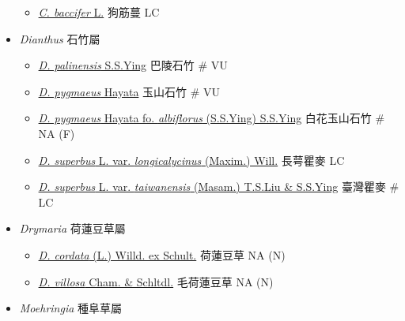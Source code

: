 \begin{itemize}
  \begin{itemize}
        \item[] \href{http://www.theplantlist.org/tpl1.1/search?q=Cucubalus+baccifer}{\textit{C. baccifer} L.}   狗筋蔓   LC
  \end{itemize}
 \item[] \textit{Dianthus} 石竹屬
                                
  \begin{itemize}
        \item[] \href{http://www.theplantlist.org/tpl1.1/search?q=Dianthus+palinensis}{\textit{D. palinensis} S.S.Ying}   巴陵石竹  \# VU
        \item[] \href{http://www.theplantlist.org/tpl1.1/search?q=Dianthus+pygmaeus}{\textit{D. pygmaeus} Hayata}   玉山石竹  \# VU
        \item[] \href{http://www.theplantlist.org/tpl1.1/search?q=Dianthus+pygmaeus+fo.+albiflorus}{\textit{D. pygmaeus} Hayata fo. \textit{albiflorus} (S.S.Ying) S.S.Ying}   白花玉山石竹  \# NA (F)
        \item[] \href{http://www.theplantlist.org/tpl1.1/search?q=Dianthus+superbus+var.+longicalycinus}{\textit{D. superbus} L. var. \textit{longicalycinus} (Maxim.) Will.}   長萼瞿麥   LC
        \item[] \href{http://www.theplantlist.org/tpl1.1/search?q=Dianthus+superbus+var.+taiwanensis}{\textit{D. superbus} L. var. \textit{taiwanensis} (Masam.) T.S.Liu \& S.S.Ying}   臺灣瞿麥  \# LC
  \end{itemize}
 \item[] \textit{Drymaria} 荷蓮豆草屬
                                
  \begin{itemize}
        \item[] \href{http://www.theplantlist.org/tpl1.1/search?q=Drymaria+cordata}{\textit{D. cordata} (L.) Willd. ex Schult.}   荷蓮豆草   NA (N)
        \item[] \href{http://www.theplantlist.org/tpl1.1/search?q=Drymaria+villosa}{\textit{D. villosa} Cham. \& Schltdl.}   毛荷蓮豆草   NA (N)
  \end{itemize}
 \item[] \textit{Moehringia} 種阜草屬
                                

\end{itemize}
